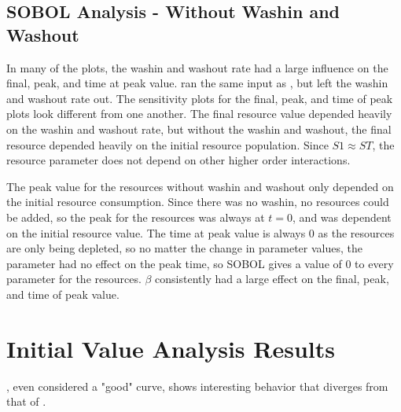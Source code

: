 \subsection{SOBOL Analysis - Without Washin and Washout}
In many of the plots, the washin and washout rate had a large influence on the final, peak, and time at peak value. 
 ran the same input as , but left the washin and washout rate out. 
The sensitivity plots for the final, peak, and time of peak plots look different from one another. 
The final resource value depended heavily on the washin and washout rate, but without the washin and washout, the final resource depended heavily on the initial resource population. 
Since $S1 \approx ST$, the resource parameter does not depend on other higher order interactions. 

The peak value for the resources without washin and washout only depended on the initial resource consumption. 
Since there was no washin, no resources could be added, so the peak for the resources was always at $t=0$, and was dependent on the initial resource value. 
The time at peak value is always 0 as the resources are only being depleted, so no matter the change in parameter values, the parameter had no effect on the peak time, so SOBOL gives a value of 0 to every parameter for the resources. 
$\beta$ consistently had a large effect on the final, peak, and time of peak value. 


\section{Initial Value Analysis Results}
\label{sec:results:initial_value_analysis}

, even considered a "good" curve, shows interesting behavior that diverges from that of . 

